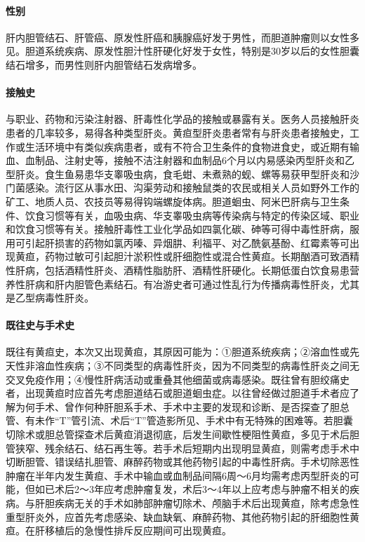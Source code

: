 \paragraph{性别}

肝内胆管结石、肝管癌、原发性肝癌和胰腺癌好发于男性，而胆道肿瘤则以女性多见。胆道系统疾病、原发性胆汁性肝硬化好发于女性，特别是30岁以后的女性胆囊结石增多，而男性则肝内胆管结石发病增多。

\paragraph{接触史}

与职业、药物和污染注射器、肝毒性化学品的接触或暴露有关。医务人员接触肝炎患者的几率较多，易得各种类型肝炎。黄疸型肝炎患者常有与肝炎患者接触史，工作或生活环境中有类似疾病患者，或有不符合卫生条件的食物进食史，或近期有输血、血制品、注射史等，接触不洁注射器和血制品6个月以内易感染丙型肝炎和乙型肝炎。食生鱼易患华支睾吸虫病，食毛蚶、未煮熟的蚬、螺等易获甲型肝炎和沙门菌感染。流行区从事水田、沟渠劳动和接触鼠类的农民或相关人员如野外工作的矿工、地质人员、农技员等易得钩端螺旋体病。胆道蛔虫、阿米巴肝病与卫生条件、饮食习惯等有关，血吸虫病、华支睾吸虫病等传染病与特定的传染区域、职业和饮食习惯等有关。接触肝毒性工业化学品如四氯化碳、砷等可得中毒性肝病，服用可引起肝损害的药物如氯丙嗪、异烟肼、利福平、对乙酰氨基酚、红霉素等可出现黄疸，药物过敏可引起胆汁淤积性或肝细胞性或混合性黄疸。长期酗酒可致酒精性肝病，包括酒精性肝炎、酒精性脂肪肝、酒精性肝硬化。长期低蛋白饮食易患营养性肝病和肝内胆管色素结石。有冶游史者可通过性乱行为传播病毒性肝炎，尤其是乙型病毒性肝炎。

\paragraph{既往史与手术史}

既往有黄疸史，本次又出现黄疸，其原因可能为：①胆道系统疾病；②溶血性或先天性非溶血性疾病；③不同类型的病毒性肝炎，因为不同类型的病毒性肝炎之间无交叉免疫作用；④慢性肝病活动或重叠其他细菌或病毒感染。既往曾有胆绞痛史者，出现黄疸时应首先考虑胆道结石或胆道蛔虫症。以往曾经做过胆道手术者应了解为何手术、曾作何种肝胆系手术、手术中主要的发现和诊断、是否探查了胆总管、有未作“T”管引流、术后“T”管造影所见、手术中有无特殊的困难等。若胆囊切除术或胆总管探查术后黄疸消退彻底，后发生间歇性梗阻性黄疸，多见于术后胆管狭窄、残余结石、结石再生等。若手术后短期内出现明显黄疸，则需考虑手术中切断胆管、错误结扎胆管、麻醉药物或其他药物引起的中毒性肝病。手术切除恶性肿瘤在半年内发生黄疸、手术中输血或血制品间隔6周～6月均需考虑丙型肝炎的可能，但如已术后2～3年应考虑肿瘤复发，术后3～4年以上应考虑与肿瘤不相关的疾病。与肝胆疾病无关的手术如肺部肿瘤切除术、颅脑手术后出现黄疸，除考虑急性重型肝炎外，应首先考虑感染、缺血缺氧、麻醉药物、其他药物引起的肝细胞性黄疸。在肝移植后的急慢性排斥反应期间可出现黄疸。

